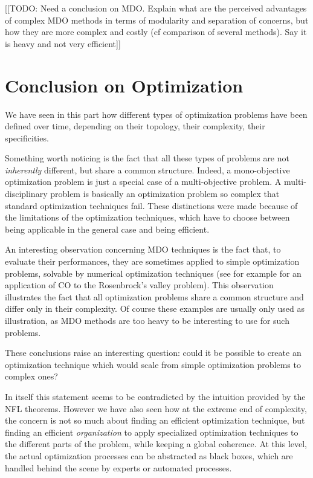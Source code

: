 [[TODO: Need a conclusion on MDO. Explain what are the perceived advantages of complex MDO methods in terms of modularity and separation of concerns, but how they are more complex and costly (cf comparison of several methods). Say it is heavy and not very efficient]]

\chapter{Conclusion on Optimization}

We have seen in this part how different types of optimization problems have been defined over time, depending on their topology, their complexity, their specificities.

Something worth noticing is the fact that all these types of problems are not \emph{inherently} different, but share a common structure. Indeed, a mono-objective optimization problem is just a special case of a multi-objective problem. A multi-disciplinary problem is basically an optimization problem so complex that standard optimization techniques fail. These distinctions were made because of the limitations of the optimization techniques, which have to choose between being applicable in the general case and being efficient.

An interesting observation concerning MDO techniques is the fact that, to evaluate their performances, they are sometimes applied to simple optimization problems, solvable by numerical optimization techniques (see for example \cite{Kroo:1994:MOM} for an application of CO to the Rosenbrock's valley problem). This observation illustrates the fact that all optimization problems share a common structure and differ only in their complexity. Of course these examples are usually only used as illustration, as MDO methods are too heavy to be interesting to use for such problems.

These conclusions raise an interesting question: could it be possible to create an optimization technique which would scale from simple optimization problems to complex ones?

In itself this statement seems to be contradicted by the intuition provided by the NFL theorems. However we have also seen how at the extreme end of complexity, the concern is not so much about finding an efficient optimization technique, but finding an efficient \emph{organization} to apply specialized optimization techniques to the different parts of the problem, while keeping a global coherence.
At this level, the actual optimization processes can be abstracted as black boxes, which are handled behind the scene by experts or automated processes.

